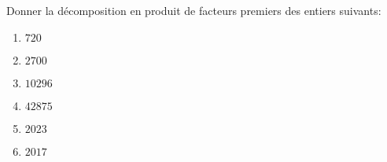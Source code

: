 
Donner la décomposition en produit de facteurs premiers des entiers suivants:
\begin{enumerate}
\item $720$
\item $2700$
\item $10296$
\item $42875$
\item $2023$
\item $2017$
\end{enumerate}

